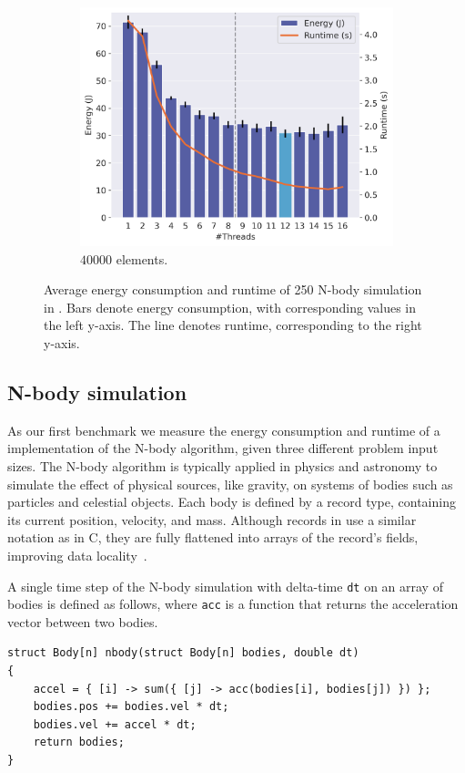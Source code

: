\begin{figure}[!ht]
\begin{subfigure}{0.33\linewidth}
        \includegraphics[width=\linewidth]{images/nbody_40000.png}
        \caption{$40000$ elements.}
        \label{fig:nbody3}
    \end{subfigure}%
    \caption{Average energy consumption and runtime of 250 N-body simulation in \sac{}.
    Bars denote energy consumption, with corresponding values in the left y-axis.
    The line denotes runtime, corresponding to the right y-axis.}
    \label{fig:nbody}
\end{figure}

\subsection{N-body simulation}

As our first benchmark we measure the energy consumption and runtime of a \sac{} implementation of
the N-body algorithm, given three different problem input sizes. The N-body algorithm is typically
applied in physics and astronomy to simulate the effect of physical sources, like gravity, on
systems of bodies such as particles and celestial objects. Each body is defined by a record type,
containing its current position, velocity, and mass. Although records in \sac{} use a similar
notation as in C, they are fully flattened into arrays of the record's fields, improving data
locality~\cite{sac-records}.

A single time step of the N-body simulation with delta-time \verb|dt| on an array of bodies is
defined as follows, where \verb|acc| is a function that returns the acceleration vector between two
bodies.
\begin{verbatim}
struct Body[n] nbody(struct Body[n] bodies, double dt)
{
    accel = { [i] -> sum({ [j] -> acc(bodies[i], bodies[j]) }) };
    bodies.pos += bodies.vel * dt;
    bodies.vel += accel * dt;
    return bodies;
}
\end{verbatim}

